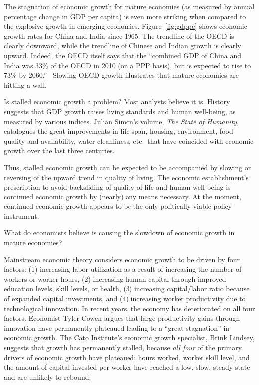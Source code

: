 The stagnation of economic growth for mature economies 
(as measured by annual percentage change in GDP per capita) 
is even more striking 
when compared to the explosive growth in emerging economies. 
Figure~\ref{fig:gdppc} shows 
economic growth rates for China and India since 1965. 
The trendline of the OECD is clearly downward, 
while the trendline of Chinese and Indian growth is clearly upward.  
Indeed, the OECD itself says that the 
``combined GDP of China and India was 33\% of the OECD in 2010 
(on a PPP basis), 
but is expected to rise to 73\% by 2060.''~\cite[p. 214]{OECD2014} 
Slowing OECD growth illustrates that mature economies are hitting a wall.

Is stalled economic growth a problem? 
Most analysts believe it is. 
History suggests that GDP growth
raises living standards and human well-being,
as measured by various indices. 
Julian Simon's volume, \emph{The State of Humanity}, 
catalogues the great improvements in 
life span, 
housing, 
environment, 
food quality and availability, 
water cleanliness, 
etc.\ 
that have coincided with 
economic growth over the last three centuries.\cite{simon1996} 

Thus, stalled economic growth can be expected 
to be accompanied by slowing or reversing
of the upward trend in quality of living. 
The economic establishment's prescription
to avoid backsliding of quality of life and human well-being
is continued economic growth by (nearly) any means necessary. 
At the moment, continued economic growth appears to be the only 
politically-viable policy instrument.

What do economists believe is causing the slowdown
of economic growth in mature economies? 

Mainstream economic theory considers 
economic growth to be driven by four factors: 
(1) increasing labor utilization as a result of increasing the number of workers or worker hours, 
(2) increasing human capital through improved education levels, skill levels, or health, 
(3) increasing capital/labor ratio because of expanded capital investments, and 
(4) increasing worker productivity due to technological innovation. 
In recent years, the economy has deteriorated on all four factors.
Economist Tyler Cowen argues that large productivity gains 
through innovation have permanently plateaued 
leading to a ``great stagnation'' in economic growth.\cite{Cowen2011}
The Cato Institute's economic growth specialist, Brink Lindsey, 
suggests that growth has permanently stalled, 
because \emph{all four} of the primary drivers of economic growth have plateaued; 
hours worked, 
worker skill level, and
the amount of capital invested per worker 
have reached 
a low, slow, steady state 
and are unlikely to rebound.\cite{lindsey2013} 

